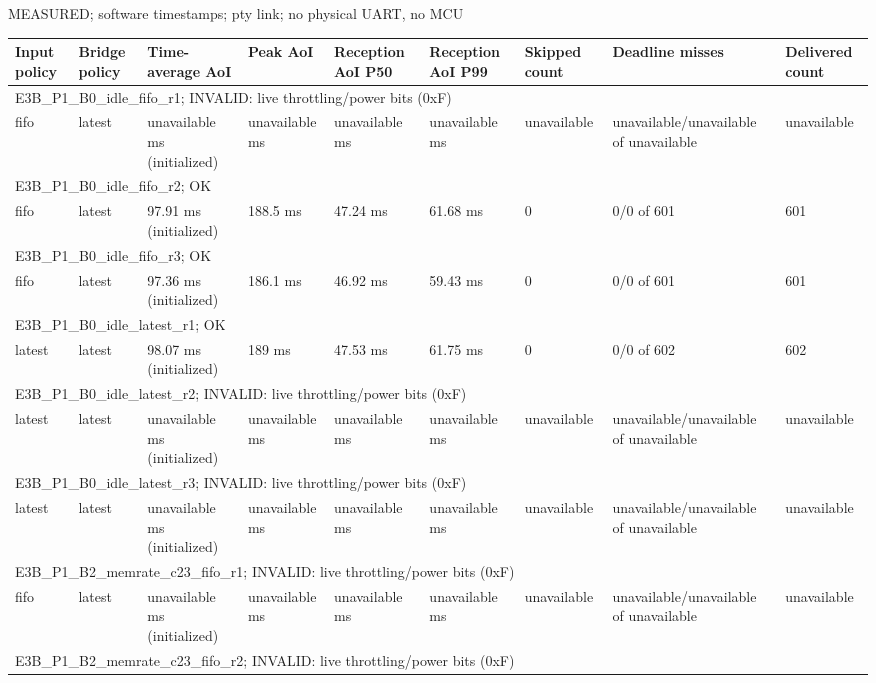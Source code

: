 \par\noindent MEASURED; software timestamps; pty link; no physical UART, no MCU\par
\begin{tabular}{lllllllll}
\toprule
Input policy & Bridge policy & Time-average AoI & Peak AoI & Reception AoI P50 & Reception AoI P99 & Skipped count & Deadline misses & Delivered count \\
\midrule
\multicolumn{9}{l}{E3B\_P1\_B0\_idle\_fifo\_r1; INVALID: live throttling/power bits (0xF)} \\
fifo & latest & unavailable ms (initialized) & unavailable ms & unavailable ms & unavailable ms & unavailable & unavailable/unavailable of unavailable & unavailable \\
\multicolumn{9}{l}{E3B\_P1\_B0\_idle\_fifo\_r2; OK} \\
fifo & latest & 97.91 ms (initialized) & 188.5 ms & 47.24 ms & 61.68 ms & 0 & 0/0 of 601 & 601 \\
\multicolumn{9}{l}{E3B\_P1\_B0\_idle\_fifo\_r3; OK} \\
fifo & latest & 97.36 ms (initialized) & 186.1 ms & 46.92 ms & 59.43 ms & 0 & 0/0 of 601 & 601 \\
\multicolumn{9}{l}{E3B\_P1\_B0\_idle\_latest\_r1; OK} \\
latest & latest & 98.07 ms (initialized) & 189 ms & 47.53 ms & 61.75 ms & 0 & 0/0 of 602 & 602 \\
\multicolumn{9}{l}{E3B\_P1\_B0\_idle\_latest\_r2; INVALID: live throttling/power bits (0xF)} \\
latest & latest & unavailable ms (initialized) & unavailable ms & unavailable ms & unavailable ms & unavailable & unavailable/unavailable of unavailable & unavailable \\
\multicolumn{9}{l}{E3B\_P1\_B0\_idle\_latest\_r3; INVALID: live throttling/power bits (0xF)} \\
latest & latest & unavailable ms (initialized) & unavailable ms & unavailable ms & unavailable ms & unavailable & unavailable/unavailable of unavailable & unavailable \\
\multicolumn{9}{l}{E3B\_P1\_B2\_memrate\_c23\_fifo\_r1; INVALID: live throttling/power bits (0xF)} \\
fifo & latest & unavailable ms (initialized) & unavailable ms & unavailable ms & unavailable ms & unavailable & unavailable/unavailable of unavailable & unavailable \\
\multicolumn{9}{l}{E3B\_P1\_B2\_memrate\_c23\_fifo\_r2; INVALID: live throttling/power bits (0xF)} \\

\end{tabular}
